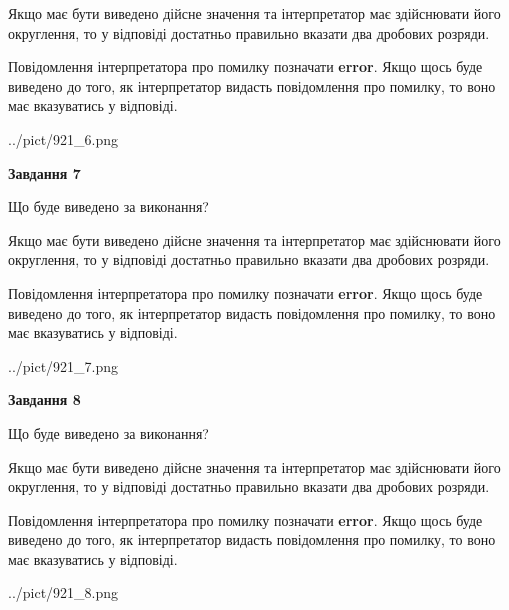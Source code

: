 \documentclass[12pt, ukrainian]{article}
\begin{document}
{\begin {Large}
Якщо має бути виведено дійсне значення та інтерпретатор має здійснювати його округлення, 
то у відповіді достатньо правильно вказати два дробових розряди.

Повідомлення інтерпретатора про помилку позначати \textbf{error}.
Якщо щось буде виведено до того, як інтерпретатор видасть повідомлення про помилку, 
то воно має вказуватись у відповіді. \par

\begin{center}
	{../pict/921_6.png}
\end{center}
\newpage

{\begin {center}\textbf{Завдання 7}\end {center}}\par
Що буде виведено за виконання? \par

Якщо має бути виведено дійсне значення та інтерпретатор має здійснювати його округлення, 
то у відповіді достатньо правильно вказати два дробових розряди.

Повідомлення інтерпретатора про помилку позначати \textbf{error}.
Якщо щось буде виведено до того, як інтерпретатор видасть повідомлення про помилку, 
то воно має вказуватись у відповіді. \par

\begin{center}
	{../pict/921_7.png}
\end{center}
\newpage

{\begin {center}\textbf{Завдання 8}\end {center}}\par
Що буде виведено за виконання? \par

Якщо має бути виведено дійсне значення та інтерпретатор має здійснювати його округлення, 
то у відповіді достатньо правильно вказати два дробових розряди.

Повідомлення інтерпретатора про помилку позначати \textbf{error}.
Якщо щось буде виведено до того, як інтерпретатор видасть повідомлення про помилку, 
то воно має вказуватись у відповіді. \par

\begin{center}
	{../pict/921_8.png}
\end{center}
\newpage


\end{Large}}
\end{document}

